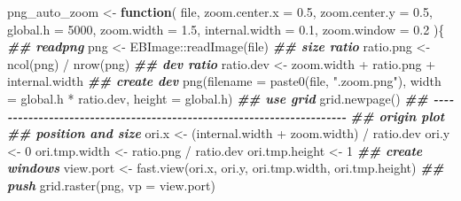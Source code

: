 \documentclass[
]{article}
\newenvironment{Shaded}{\begin{snugshade}}{\end{snugshade}}
\newcommand{\AttributeTok}[1]{\textcolor[rgb]{0.77,0.63,0.00}{#1}}
\newcommand{\ControlFlowTok}[1]{\textcolor[rgb]{0.13,0.29,0.53}{\textbf{#1}}}
\newcommand{\DecValTok}[1]{\textcolor[rgb]{0.00,0.00,0.81}{#1}}
\newcommand{\DocumentationTok}[1]{\textcolor[rgb]{0.56,0.35,0.01}{\textbf{\textit{#1}}}}
\newcommand{\FloatTok}[1]{\textcolor[rgb]{0.00,0.00,0.81}{#1}}
\newcommand{\FunctionTok}[1]{\textcolor[rgb]{0.00,0.00,0.00}{#1}}
\newcommand{\NormalTok}[1]{#1}
\newcommand{\OtherTok}[1]{\textcolor[rgb]{0.56,0.35,0.01}{#1}}
\newcommand{\SpecialCharTok}[1]{\textcolor[rgb]{0.00,0.00,0.00}{#1}}
\newcommand{\StringTok}[1]{\textcolor[rgb]{0.31,0.60,0.02}{#1}}
\begin{document}
\begin{Shaded}
\begin{Highlighting}[]
\NormalTok{png\_auto\_zoom }\OtherTok{\textless{}{-}} 
  \ControlFlowTok{function}\NormalTok{(}
\NormalTok{           file,}
           \AttributeTok{zoom.center.x =} \FloatTok{0.5}\NormalTok{,}
           \AttributeTok{zoom.center.y =} \FloatTok{0.5}\NormalTok{,}
           \AttributeTok{global.h =} \DecValTok{5000}\NormalTok{,}
           \AttributeTok{zoom.width =} \FloatTok{1.5}\NormalTok{,}
           \AttributeTok{internal.width =} \FloatTok{0.1}\NormalTok{,}
           \AttributeTok{zoom.window =} \FloatTok{0.2}
\NormalTok{           )\{}
    \DocumentationTok{\#\# readpng}
\NormalTok{    png }\OtherTok{\textless{}{-}}\NormalTok{ EBImage}\SpecialCharTok{::}\FunctionTok{readImage}\NormalTok{(file)}
    \DocumentationTok{\#\# size ratio}
\NormalTok{    ratio.png }\OtherTok{\textless{}{-}} \FunctionTok{ncol}\NormalTok{(png) }\SpecialCharTok{/} \FunctionTok{nrow}\NormalTok{(png)}
    \DocumentationTok{\#\# dev ratio}
\NormalTok{    ratio.dev }\OtherTok{\textless{}{-}}\NormalTok{ zoom.width }\SpecialCharTok{+}\NormalTok{ ratio.png }\SpecialCharTok{+}\NormalTok{ internal.width}
    \DocumentationTok{\#\# create dev}
    \FunctionTok{png}\NormalTok{(}\AttributeTok{filename =} \FunctionTok{paste0}\NormalTok{(file, }\StringTok{".zoom.png"}\NormalTok{),}
        \AttributeTok{width =}\NormalTok{ global.h }\SpecialCharTok{*}\NormalTok{ ratio.dev,}
        \AttributeTok{height =}\NormalTok{ global.h)}
    \DocumentationTok{\#\# use grid}
    \FunctionTok{grid.newpage}\NormalTok{()}
    \DocumentationTok{\#\# {-}{-}{-}{-}{-}{-}{-}{-}{-}{-}{-}{-}{-}{-}{-}{-}{-}{-}{-}{-}{-}{-}{-}{-}{-}{-}{-}{-}{-}{-}{-}{-}{-}{-}{-}{-}{-}{-}{-}{-}{-}{-}{-}{-}{-}{-}{-}{-}{-}{-}{-}{-}{-}{-}{-}{-}{-}{-}{-}{-}{-}{-}{-}{-}{-}{-}{-}{-}{-}{-} }
    \DocumentationTok{\#\# origin plot}
    \DocumentationTok{\#\# position and size}
\NormalTok{    ori.x }\OtherTok{\textless{}{-}}\NormalTok{ (internal.width }\SpecialCharTok{+}\NormalTok{ zoom.width) }\SpecialCharTok{/}\NormalTok{ ratio.dev}
\NormalTok{    ori.y }\OtherTok{\textless{}{-}} \DecValTok{0}
\NormalTok{    ori.tmp.width }\OtherTok{\textless{}{-}}\NormalTok{ ratio.png }\SpecialCharTok{/}\NormalTok{ ratio.dev}
\NormalTok{    ori.tmp.height }\OtherTok{\textless{}{-}} \DecValTok{1}
    \DocumentationTok{\#\# create windows}
\NormalTok{    view.port }\OtherTok{\textless{}{-}} \FunctionTok{fast.view}\NormalTok{(ori.x, ori.y, ori.tmp.width, ori.tmp.height)}
    \DocumentationTok{\#\# push}
    \FunctionTok{grid.raster}\NormalTok{(png, }\AttributeTok{vp =}\NormalTok{ view.port)}

\end{Highlighting}
\end{Shaded}
\end{document}
